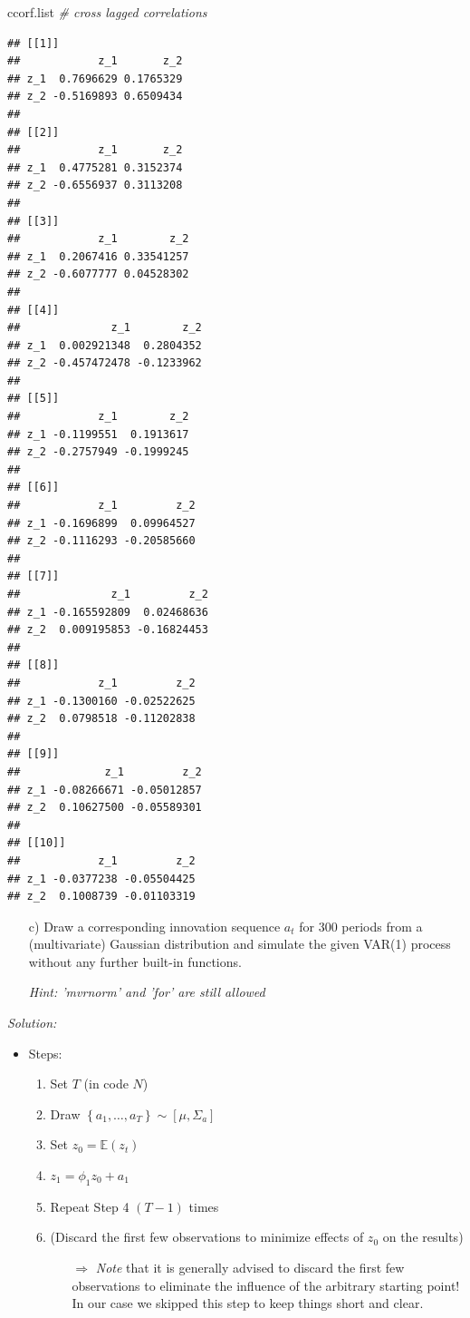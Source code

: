 \documentclass[12pt,a4paper]{article}
\newenvironment{Shaded}{\begin{snugshade}}{\end{snugshade}}
\newcommand{\CommentTok}[1]{\textcolor[rgb]{0.56,0.35,0.01}{\textit{#1}}}
\newcommand{\NormalTok}[1]{#1}
\begin{document}
\begin{Shaded}
\begin{Highlighting}[]
\NormalTok{ccorf.list }\CommentTok{# cross lagged correlations}
\end{Highlighting}
\end{Shaded}

\begin{verbatim}
## [[1]]
##            z_1       z_2
## z_1  0.7696629 0.1765329
## z_2 -0.5169893 0.6509434
## 
## [[2]]
##            z_1       z_2
## z_1  0.4775281 0.3152374
## z_2 -0.6556937 0.3113208
## 
## [[3]]
##            z_1        z_2
## z_1  0.2067416 0.33541257
## z_2 -0.6077777 0.04528302
## 
## [[4]]
##              z_1        z_2
## z_1  0.002921348  0.2804352
## z_2 -0.457472478 -0.1233962
## 
## [[5]]
##            z_1        z_2
## z_1 -0.1199551  0.1913617
## z_2 -0.2757949 -0.1999245
## 
## [[6]]
##            z_1         z_2
## z_1 -0.1696899  0.09964527
## z_2 -0.1116293 -0.20585660
## 
## [[7]]
##              z_1         z_2
## z_1 -0.165592809  0.02468636
## z_2  0.009195853 -0.16824453
## 
## [[8]]
##            z_1         z_2
## z_1 -0.1300160 -0.02522625
## z_2  0.0798518 -0.11202838
## 
## [[9]]
##             z_1         z_2
## z_1 -0.08266671 -0.05012857
## z_2  0.10627500 -0.05589301
## 
## [[10]]
##            z_1         z_2
## z_1 -0.0377238 -0.05504425
## z_2  0.1008739 -0.01103319
\end{verbatim}

\begin{itemize}
  \item[c)] Draw a corresponding innovation sequence $a_t$ for 300 periods from a (multivariate) Gaussian distribution and simulate the given VAR(1) process without any further built-in functions.
  \item[] \textit{Hint: 'mvrnorm' and 'for' are still allowed}
\end{itemize}

\emph{Solution:}\\

\begin{itemize}
  \item Steps:
  \begin{enumerate}
    \item Set $T$ (in code $N$)
    \item Draw $\left\{ a_1, \ldots , a_T \right\} \sim \left[ \mu , \Sigma_a \right]$
    \item Set $z_0 = \mathbb{E} \left( z_t\right)$
    \item $z_1 = \phi_1 z_0 + a_1$
    \item Repeat Step 4 $(T - 1)$ times
    \item (Discard the first few observations to minimize effects of $z_0$ on the results)
    \begin{itemize}
      \item[$\Rightarrow$] \textit{Note} that it is generally advised to discard the first few observations to eliminate the influence of the arbitrary starting point! In our case we skipped this step to keep things short and clear.
    \end{itemize}
  \end{enumerate}
\end{itemize}
\end{document}
